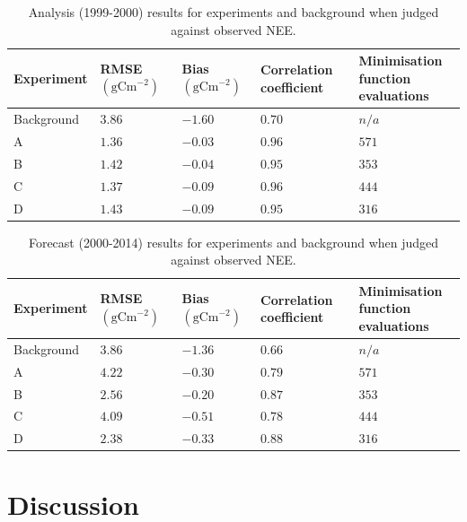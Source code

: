 \documentclass[11pt]{article}
\begin{document}
\begin{table}[ht] 
\begin{center}
	\begin{tabular}{| l | l | l | l | l |}
	\hline
	Experiment & RMSE $( \text{gCm}^{-2})$ & Bias $( \text{gCm}^{-2})$ & Correlation coefficient & \pbox{5cm}{Minimisation function \\ evaluations} \\ \hline
	Background & $3.86$ & $-1.60$ & $0.70$ & $n/a$ \\ \hline
	A & $1.36$ & $-0.03$ & $0.96$ & $571$ \\ \hline
	B & $1.42$ & $-0.04$ & $0.95$ & $353$  \\ \hline
	C & $1.37$ & $-0.09$ & $0.96$ & $444$ \\ \hline
	D & $1.43$ & $-0.09$ & $0.95$ & $316$ \\ 
	\hline
	\end{tabular}
	\caption{Analysis (1999-2000) results for experiments and background when judged against observed NEE.}
	\label{table:exps_tab}
\end{center} 
\end{table}

\begin{table}[ht] 
\begin{center}
	\begin{tabular}{| l | l | l | l | l |}
	\hline
	Experiment & RMSE $( \text{gCm}^{-2})$ & Bias $( \text{gCm}^{-2})$ &  Correlation coefficient & \pbox{6cm}{Minimisation function \\ evaluations} \\ \hline
	Background & $3.86$ & $-1.36$ & $0.66$ & $n/a$ \\ \hline
	A & $4.22$ & $-0.30$ & $0.79$ & $571$ \\ \hline
	B & $2.56$ & $-0.20$ & $0.87$ & $353$  \\ \hline
	C & $4.09$ & $-0.51$ & $0.78$ & $444$ \\ \hline
	D & $2.38$ & $-0.33$ & $0.88$ & $316$ \\ 
	\hline
	\end{tabular}
	\caption{Forecast (2000-2014) results for experiments and background when judged against observed NEE.}
	\label{table:exps_tab}
\end{center} 
\end{table}


\section{Discussion}
\end{document}
